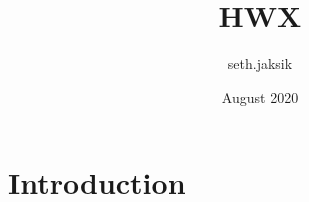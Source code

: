 \documentclass{article}
\title{HWX}
\author{seth.jaksik }
\date{August 2020}
\begin{document}
\maketitle

\section{Introduction}
\end{document}
